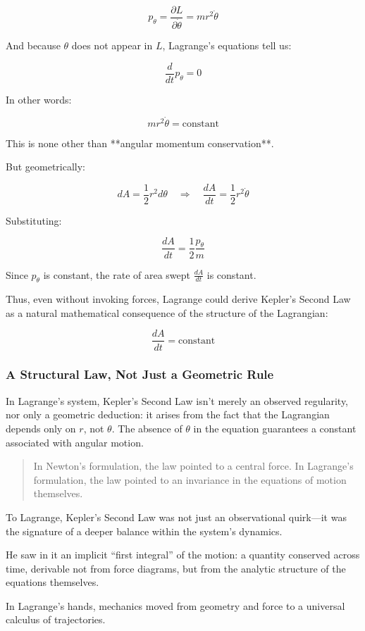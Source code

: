 \[
p_\theta = \frac{\partial L}{\partial \dot{\theta}} = m r^2 \dot{\theta}
\]

And because \( \theta \) does not appear in \( L \), Lagrange’s equations tell us:

\[
\frac{d}{dt} p_\theta = 0
\]

In other words:

\[
m r^2 \dot{\theta} = \text{constant}
\]

This is none other than **angular momentum conservation**.

\medskip

But geometrically:

\[
dA = \frac{1}{2} r^2 d\theta
\quad \Rightarrow \quad
\frac{dA}{dt} = \frac{1}{2} r^2 \dot{\theta}
\]

Substituting:

\[
\frac{dA}{dt} = \frac{1}{2} \frac{p_\theta}{m}
\]

Since \( p_\theta \) is constant, the rate of area swept \( \frac{dA}{dt} \) is constant.

Thus, even without invoking forces, Lagrange could derive Kepler’s Second Law as a natural mathematical consequence of the structure of the Lagrangian:

\[
\frac{dA}{dt} = \text{constant}
\]

\subsubsection{A Structural Law, Not Just a Geometric Rule}

In Lagrange’s system, Kepler’s Second Law isn’t merely an observed regularity, nor only a geometric deduction: it arises from the fact that the Lagrangian depends only on \( r \), not \( \theta \).  
The absence of \( \theta \) in the equation guarantees a constant associated with angular motion.

\begin{quote}
In Newton’s formulation, the law pointed to a central force.  
In Lagrange’s formulation, the law pointed to an invariance in the equations of motion themselves.
\end{quote}

\begin{tcolorbox}[colback=blue!5!white, colframe=blue!50!black, 
  title={Historical Sidebar: What Lagrange Saw in Kepler’s Law}]

To Lagrange, Kepler’s Second Law was not just an observational quirk—it was the signature of a deeper balance within the system’s dynamics.

He saw in it an implicit “first integral” of the motion: a quantity conserved across time, derivable not from force diagrams, but from the analytic structure of the equations themselves.

In Lagrange’s hands, mechanics moved from geometry and force to a universal calculus of trajectories.

\end{tcolorbox}

